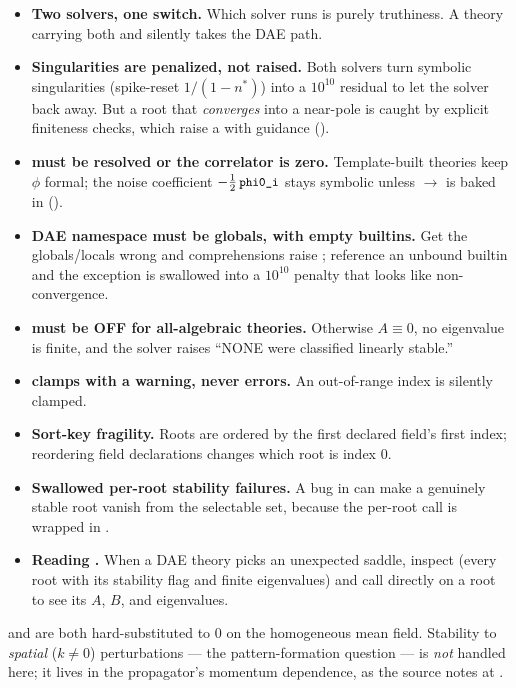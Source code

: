 \begin{itemize}
  \item \textbf{Two solvers, one switch.} Which solver runs is purely
         truthiness. A theory carrying both
         and  silently takes the DAE
        path.
  \item \textbf{Singularities are penalized, not raised.} Both solvers turn
        symbolic singularities (spike-reset $1/(1-n^{*})$) into a $10^{10}$
        residual to let the solver back away. But a root that \emph{converges}
        into a near-pole is caught by explicit finiteness checks, which raise a
         with guidance ().
  \item \textbf{ must be resolved or the correlator is zero.}
        Template-built theories keep $\phi$ formal; the noise coefficient
        $-\tfrac12\,\texttt{\small phi0\_i}$ stays symbolic unless  $\to$
         is baked in ().
  \item \textbf{DAE  namespace must be globals, with empty builtins.}
        Get the globals/locals wrong and comprehensions raise ;
        reference an unbound builtin and the exception is swallowed into a
        $10^{10}$ penalty that looks like non-convergence.
  \item \textbf{ must be OFF for all-algebraic
        theories.} Otherwise $A\equiv 0$, no eigenvalue is finite, and the solver
        raises ``NONE were classified linearly stable.''
  \item \textbf{ clamps with a warning, never errors.}
        An out-of-range index is silently clamped.
  \item \textbf{Sort-key fragility.} Roots are ordered by the first declared
        field's first index; reordering field declarations changes which root is
        index $0$.
  \item \textbf{Swallowed per-root stability failures.} A bug in
         can make a genuinely stable root vanish from the
        selectable set, because the per-root call is wrapped in
        .
  \item \textbf{Reading .} When a DAE theory picks an
        unexpected saddle, inspect  (every root with
        its stability flag and finite eigenvalues) and call
         directly on a root to
        see its $A$, $B$, and eigenvalues.
\end{itemize}

\begin{note}
 and  are both hard-substituted to $0$ on the
homogeneous mean field. Stability to \emph{spatial} ($k\neq 0$) perturbations ---
the pattern-formation question --- is \emph{not} handled here; it lives in the
propagator's momentum dependence, as the source notes at
.
\end{note}
